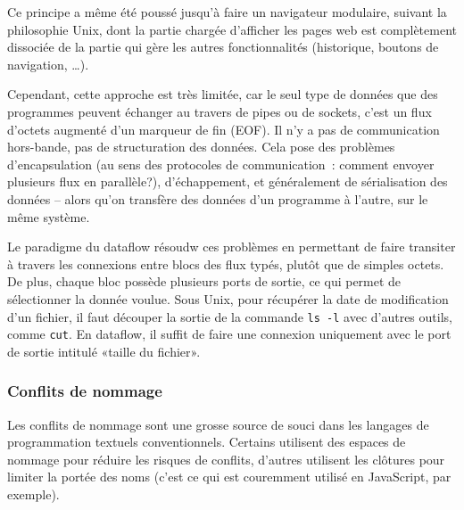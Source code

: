 \documentclass{article}
\begin{document}
Ce principe a même été poussé jusqu'à faire un navigateur modulaire, suivant la philosophie Unix, dont la partie chargée d'afficher les
pages web est complètement dissociée de la partie qui gère les autres fonctionnalités (historique, boutons de navigation, \dots).

Cependant, cette approche est très limitée, car le seul type de données que des programmes peuvent échanger au travers de pipes ou de
sockets, c'est un flux d'octets augmenté d'un marqueur de fin (EOF). Il n'y a pas de communication hors-bande, pas de structuration des
données. Cela pose des problèmes d'encapsulation (au sens des protocoles de communication~: comment envoyer plusieurs flux en parallèle?),
d'échappement, et généralement de sérialisation des données -- alors qu'on transfère des données d'un programme à l'autre, sur le même
système.

Le paradigme du dataflow résoudw ces problèmes en permettant de faire transiter à travers les connexions entre blocs des flux typés, plutôt
que de simples octets. De plus, chaque bloc possède plusieurs ports de sortie, ce qui permet de sélectionner la donnée voulue. Sous Unix,
pour récupérer la date de modification d'un fichier, il faut découper la sortie de la commande \texttt{ls -l} avec d'autres outils, comme
\texttt{cut}. En dataflow, il suffit de faire une connexion uniquement avec le port de sortie intitulé «taille du fichier».



\subsubsection{Conflits de nommage}
Les conflits de nommage sont une grosse source de souci dans les langages de programmation textuels conventionnels. Certains utilisent des
espaces de nommage pour réduire les risques de conflits, d'autres utilisent les clôtures pour limiter la portée des noms (c'est ce qui est
couremment utilisé en JavaScript, par exemple).
\end{document}
